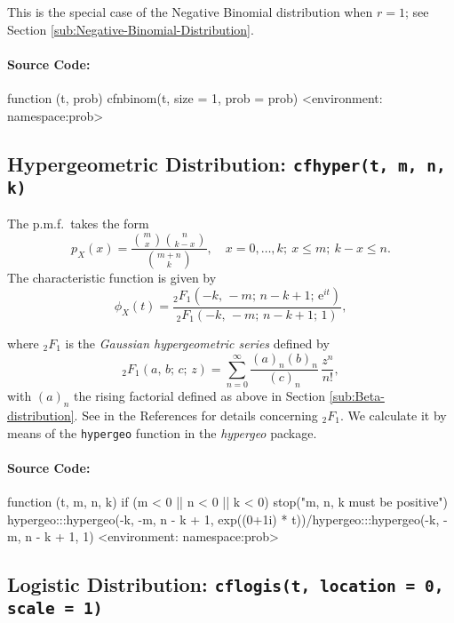 \documentclass[english]{article}
\newcommand{\Rpackage}[1]{{\textit{#1}}}
\newcommand{\me}{\mathrm{e}}
\begin{document}
This is the special case of the Negative Binomial distribution when
$r=1$; see Section \ref{sub:Negative-Binomial-Distribution}.


\paragraph*{Source Code:}

\begin{Schunk}
\begin{Soutput}
function (t, prob) 
{
    cfnbinom(t, size = 1, prob = prob)
}
<environment: namespace:prob>
\end{Soutput}
\end{Schunk}


\subsection{Hypergeometric Distribution: \texttt{cfhyper(t, m, n, k)}}

The p.m.f.~takes the form\[
p_{X}(x)=\frac{{m \choose x}{n \choose k-x}}{{m+n \choose k}},\quad x=0,\ldots,k;\ x\leq m;\ k-x\leq n.\]
The characteristic function is given by\[
\phi_{X}(t)=\frac{_{2}F_{1}\left(-k,\,-m;\, n-k+1;\,\me^{it}\right)}{_{2}F_{1}\left(-k,\,-m;\, n-k+1;\,1\right)},\]


where $_{2}F_{1}$ is the \emph{Gaussian hypergeometric series} defined
by\[
_{2}F_{1}(a,\, b;\, c;\, z)=\sum_{n=0}^{\infty}\frac{(a)_{n}(b)_{n}}{(c)_{n}}\,\frac{z^{n}}{n!},\]
with $(a)_{n}$ the rising factorial defined as above in Section \ref{sub:Beta-distribution}.
See \cite{GaussHyper} in the References for details concerning $_{2}F_{1}$.
We calculate it by means of the \texttt{hypergeo} function in the
\Rpackage{hypergeo} package.


\paragraph*{Source Code:}

\begin{Schunk}
\begin{Soutput}
function (t, m, n, k) 
{
    if (m < 0 || n < 0 || k < 0) 
        stop("m, n, k must be positive")
    hypergeo:::hypergeo(-k, -m, n - k + 1, exp((0+1i) * t))/hypergeo:::hypergeo(-k, 
        -m, n - k + 1, 1)
}
<environment: namespace:prob>
\end{Soutput}
\end{Schunk}


\subsection{Logistic Distribution: \texttt{cflogis(t, location = 0, scale = 1)}}
\end{document}
